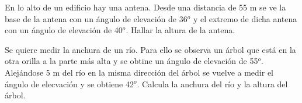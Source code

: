 \vspace{-8mm}
\begin{flushright}
\begin{footnotesize} \textcolor{gris}{}	\end{footnotesize}
\end{flushright}


\begin{mipropuesto}

 En lo alto de un edificio hay una antena. Desde una distancia de 55 m se ve la base de la antena con un ángulo de elevación de 36$^o$ y el extremo de dicha antena con un ángulo de elevación de 40$^o$. Hallar la altura de la antena.
 
\end{mipropuesto}

\vspace{-8mm}
\begin{flushright}
\begin{footnotesize} \textcolor{gris}{}	\end{footnotesize}
\end{flushright}


\begin{mipropuesto}

 Se quiere medir la anchura de un río. Para ello se observa un árbol que está en la otra orilla a la parte más alta y se obtine un ángulo de elevación de 55$^o$. Alejándose 5 m del río en la misma dirección del árbol se vuelve a medir el ángulo de elecvación y se obtiene 42$^o$. Calcula la anchura del río y la altura del árbol.

\end{mipropuesto}

\vspace{-8mm}
\begin{flushright}
\begin{footnotesize} \textcolor{gris}{}	\end{footnotesize}
\end{flushright}




\vspace{5mm}%

\newpage
$\quad$

